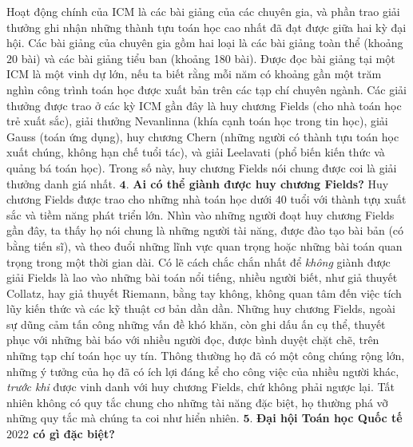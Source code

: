 \begin{multicols}{2}
	Hoạt động chính của ICM là các bài giảng của các chuyên gia, và phần trao giải thưởng ghi nhận những thành tựu toán học cao nhất đã đạt được giữa hai kỳ đại hội. Các bài giảng của chuyên gia gồm hai loại là các bài giảng toàn thể (khoảng $20$ bài) và các bài giảng tiểu ban (khoảng 180 bài). Được đọc bài giảng tại một ICM là một vinh dự lớn, nếu ta biết rằng mỗi năm có khoảng gần một trăm nghìn công trình toán học được xuất bản trên các tạp chí chuyên ngành. Các giải thưởng được trao ở các kỳ ICM gần đây là huy chương Fields (cho nhà toán học trẻ xuất sắc), giải thưởng Nevanlinna (khía cạnh toán học trong tin học), giải Gauss (toán ứng dụng), huy chương Chern (những người có thành tựu toán học xuất chúng, không hạn chế tuổi tác), và giải Leelavati (phổ biến kiến thức và quảng bá toán học). Trong số này, huy chương Fields nói chung được coi là giải thưởng danh giá nhất.
	\vskip 0.1cm
	$\pmb{4.}$ \textbf{\color{doisongtoanhoc}Ai có thể giành được huy chương Fields?}
	\vskip 0.1cm
	Huy chương Fields được trao cho những nhà toán học dưới $40$ tuổi với thành tựụ xuất sắc và tiềm năng phát triển lớn. Nhìn vào những người đoạt huy chương Fields gần đây, ta thấy họ nói chung là những người tài năng, được đào tạo bài bản (có bằng tiến sĩ), và theo đuổi những lĩnh vực quan trọng hoặc những bài toán quan trọng trong một thời gian dài. Có lẽ cách chắc chắn nhất để \emph{không} giành được giải Fields là lao vào những bài toán nổi tiếng, nhiều người biết, như giả thuyết Collatz, hay giả thuyết Riemann, bằng tay không, không quan tâm đến việc tích lũy kiến thức và các kỹ thuật cơ bản dần dần. Những huy chương Fields, ngoài sự dũng cảm tấn công những vấn đề khó khăn, còn ghi dấu ấn cụ thể, thuyết phục với những bài báo với nhiều người đọc, được bình duyệt chặt chẽ, trên những tạp chí toán học uy tín. Thông thường họ đã có một công chúng rộng lớn, những ý tưởng của họ đã có ích lợi đáng kể cho công việc của nhiều người khác, \emph{trước khi} được vinh danh với huy chương Fields, chứ không phải ngược lại. Tất nhiên không có quy tắc chung cho những tài năng đặc biệt, họ thường  phá vỡ những quy tắc mà chúng ta coi như hiển nhiên.
	\vskip 0.1cm
	$\pmb{5.}$ \textbf{\color{doisongtoanhoc}Đại hội Toán học Quốc tế $2022$ có gì đặc biệt?}
	\vskip 0.1cm

\end{multicols}
